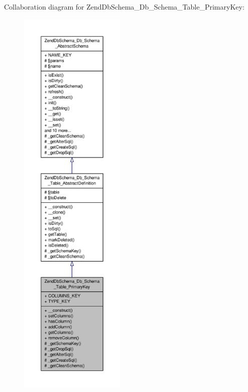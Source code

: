 Collaboration diagram for Zend\-Db\-Schema\-\_\-\-Db\-\_\-\-Schema\-\_\-\-Table\-\_\-\-Primary\-Key\-:\nopagebreak
\begin{figure}[H]
\begin{center}
\leavevmode
\includegraphics[height=550pt]{classZendDbSchema__Db__Schema__Table__PrimaryKey__coll__graph}
\end{center}
\end{figure}
